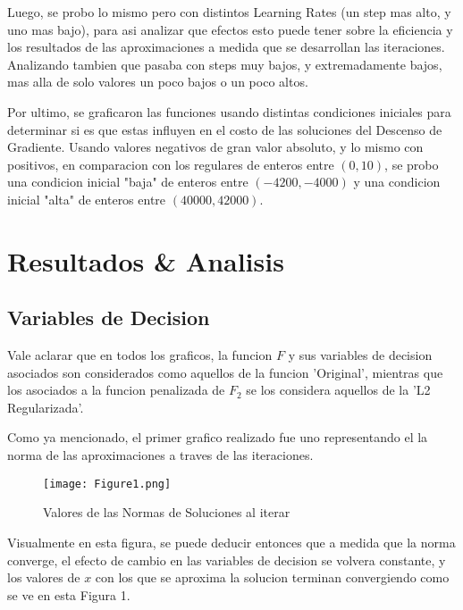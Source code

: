 \documentclass{article}
\begin{document}
\noindent Luego, se probo lo mismo pero con distintos Learning Rates (un step mas alto, y uno mas bajo), para asi analizar que efectos esto puede tener sobre la eficiencia y los resultados de las aproximaciones a medida que se desarrollan las iteraciones. Analizando tambien que pasaba con steps muy bajos, y extremadamente bajos, mas alla de solo valores un poco bajos o un poco altos. \vspace{\baselineskip}

\noindent Por ultimo, se graficaron las funciones usando distintas condiciones iniciales para determinar si es que estas influyen en el costo de las soluciones del Descenso de Gradiente. Usando valores negativos de gran valor absoluto, y lo mismo con positivos, en comparacion con los regulares de enteros entre $(0, 10)$, se probo una condicion inicial "baja" de enteros entre $(-4200, -4000)$ y una condicion inicial "alta" de enteros entre $(40000, 42000)$.



\section*{Resultados \& Analisis}

\subsection*{Variables de Decision}

\noindent Vale aclarar que en todos los graficos, la funcion $F$ y sus variables de decision asociados son considerados como aquellos de la funcion 'Original', mientras que los asociados a la funcion penalizada de $F_2$ se los considera aquellos de la 'L2 Regularizada'. 
\vspace{\baselineskip}

\noindent Como ya mencionado, el primer grafico realizado fue uno representando el la norma de las aproximaciones a traves de las iteraciones.

\begin{figure}[ht]
    \centering
    \caption{Valores de las Normas de Soluciones al iterar}
    \texttt{[image: Figure1.png]}
    \label{fig:Image 1}
\end{figure}

\noindent Visualmente en esta figura, se puede deducir entonces que a medida que la norma converge, el efecto de cambio en las variables de decision se volvera constante, y los valores de $x$ con los que se aproxima la solucion terminan convergiendo como se ve en esta Figura 1. 
\vspace{\baselineskip}
\end{document}
